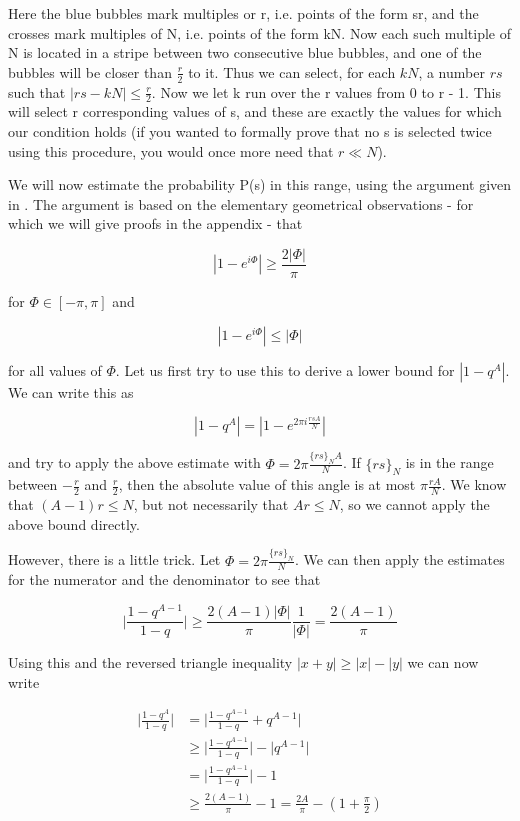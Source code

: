 \documentclass[a4paper, draft]{article}
\theoremstyle{own}
\theoremstyle{remark}
\begin{document}
Here the blue bubbles mark multiples or r, i.e. points of the form sr, and the crosses mark multiples of N, i.e. points of the form kN. Now each such multiple of N is located in a stripe between two consecutive blue bubbles, and one of the bubbles will be closer than $\frac{r}{2}$ to it. Thus we can select, for each $kN$, a number $rs$ such that $|rs - kN| \leq \frac{r}{2}$. Now we let k run over the r values from 0 to r - 1. This will select r corresponding values of s, and these are exactly the values for which our condition holds (if you wanted to formally prove that no s is selected twice using this procedure, you would once more need that $r \ll N$).
 
We will now estimate the probability P(s) in this range, using the argument given in \cite{P}. The argument is based on the elementary geometrical observations - for which we will give proofs in the appendix - that 

$$
| 1 - e^{i\Phi}| \geq \frac{2 |\Phi|}{\pi}
$$

for $\Phi \in [-\pi,\pi]$ and 

$$
| 1 - e^{i\Phi}| \leq |\Phi|
$$

for all values of $\Phi$. Let us first try to use this to derive a lower bound for $|1 - q^A|$. We can write this as

$$
|1 - q^A| = |1 - e^{2\pi i \frac{rsA}{N}} | 
$$

and try to apply the above estimate with $\Phi = 2 \pi \frac{\{rs\}_N A}{N}$. If $\{ rs\}_N$ is in the range between $-\frac{r}{2}$ and $\frac{r}{2}$, then the absolute value of this angle is at most $\pi \frac{rA}{N}$. We know that $(A-1)r \leq N$, but not necessarily that $Ar \leq N$, so we cannot apply the above bound directly. 

However, there is a little trick. Let $\Phi = 2 \pi \frac{\{rs\}_N}{N}$. We can then apply the estimates for the numerator and the denominator to see that

$$
\big| \frac{1-q^{A-1}}{1-q} \big| \geq \frac{2 (A-1)|\Phi|}{\pi} \frac{1}{|\Phi|} = \frac{2(A-1)}{\pi} 
$$

Using this and the reversed triangle inequality $|x + y| \geq |x| - |y|$ we can now write

\begin{align*}
\big| \frac{1-q^A}{1-q} \big| &= \big| \frac{1-q^{A-1}}{1-q} + q^{A-1} \big| \\
& \geq \big| \frac{1-q^{A-1}}{1-q} \big| - \big| q^{A-1} \big | \\
&= \big| \frac{1-q^{A-1}}{1-q} \big| - 1  \\
&\geq \frac{2(A-1)}{\pi}  - 1 = \frac{2A}{\pi} - (1 + \frac{\pi}{2})
\end{align*}
\end{document}
